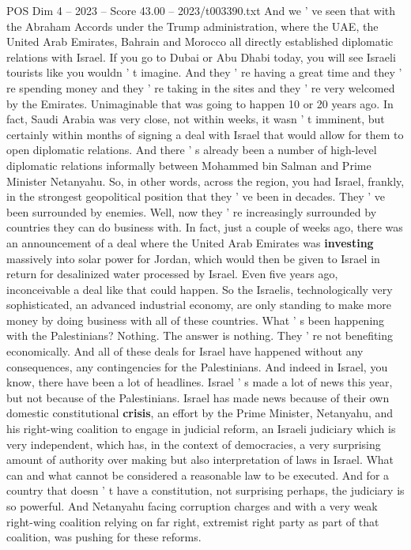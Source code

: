 \begin{textsample}{POS Dim 4 – 2023 – Score 43.00 – 2023/t003390.txt}
And we ' ve seen that with the Abraham Accords under the Trump administration, where the UAE, the United Arab Emirates, Bahrain and Morocco all directly established diplomatic relations with Israel.
If you go to Dubai or Abu Dhabi today, you will see Israeli tourists like you wouldn ' t imagine.
And they ' re having a great time and they ' re spending money and they ' re taking in the sites and they ' re very welcomed by the Emirates.
Unimaginable that was going to happen 10 or 20 years ago.
In fact, Saudi Arabia was very close, not within weeks, it wasn ' t imminent, but certainly within months of signing a deal with Israel that would allow for them to open diplomatic relations.
And there ' s already been a number of high-level diplomatic relations informally between Mohammed bin Salman and Prime Minister Netanyahu.
So, in other words, across the region, you had Israel, frankly, in the strongest geopolitical position that they ' ve been in decades.
They ' ve been surrounded by enemies.
Well, now they ' re increasingly surrounded by countries they can do business with.
In fact, just a couple of weeks ago, there was an announcement of a deal where the United Arab Emirates was \textbf{investing} massively into solar power for Jordan, which would then be given to Israel in return for desalinized water processed by Israel.
Even five years ago, inconceivable a deal like that could happen.
So the Israelis, technologically very sophisticated, an advanced industrial economy, are only standing to make more money by doing business with all of these countries.
What ' s been happening with the Palestinians?
Nothing.
The answer is nothing.
They ' re not benefiting economically.
And all of these deals for Israel have happened without any consequences, any contingencies for the Palestinians.
And indeed in Israel, you know, there have been a lot of headlines.
Israel ' s made a lot of news this year, but not because of the Palestinians.
Israel has made news because of their own domestic constitutional \textbf{crisis}, an effort by the Prime Minister, Netanyahu, and his right-wing coalition to engage in judicial reform, an Israeli judiciary which is very independent, which has, in the context of democracies, a very surprising amount of authority over making but also interpretation of laws in Israel.
What can and what cannot be considered a reasonable law to be executed.
And for a country that doesn ' t have a constitution, not surprising perhaps, the judiciary is so powerful.
And Netanyahu facing corruption charges and with a very weak right-wing coalition relying on far right, extremist right party as part of that coalition, was pushing for these reforms.

\end{textsample}
